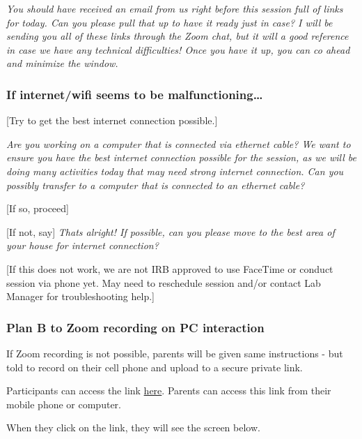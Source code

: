\documentclass[]{book}
\begin{document}
\emph{You should have received an email from us right before this session full of links for today. Can you please pull that up to have it ready just in case? I will be sending you all of these links through the Zoom chat, but it will a good reference in case we have any technical difficulties! Once you have it up, you can co ahead and minimize the window.}

\hypertarget{if-internetwifi-seems-to-be-malfunctioning}{%
\subsubsection{If internet/wifi seems to be malfunctioning\ldots{}}\label{if-internetwifi-seems-to-be-malfunctioning}}

{[}Try to get the best internet connection possible.{]}

\emph{Are you working on a computer that is connected via ethernet cable? We want to ensure you have the best internet connection possible for the session, as we will be doing many activities today that may need strong internet connection. Can you possibly transfer to a computer that is connected to an ethernet cable?}

{[}If so, proceed{]}

{[}If not, say{]} \emph{Thats alright! If possible, can you please move to the best area of your house for internet connection?}

{[}If this does not work, we are not IRB approved to use FaceTime or conduct session via phone yet. May need to reschedule session and/or contact Lab Manager for troubleshooting help.{]}

\hypertarget{plan-b-to-zoom-recording-on-pc-interaction}{%
\subsubsection{Plan B to Zoom recording on PC interaction}\label{plan-b-to-zoom-recording-on-pc-interaction}}

If Zoom recording is not possible, parents will be given same instructions - but told to record on their cell phone and upload to a secure private link.

Participants can access the link \href{https://ucla.app.box.com/f/3c52df2afb1a446ab363b793f8af22c1}{here}. Parents can access this link from their mobile phone or computer.

When they click on the link, they will see the screen below.
\end{document}
